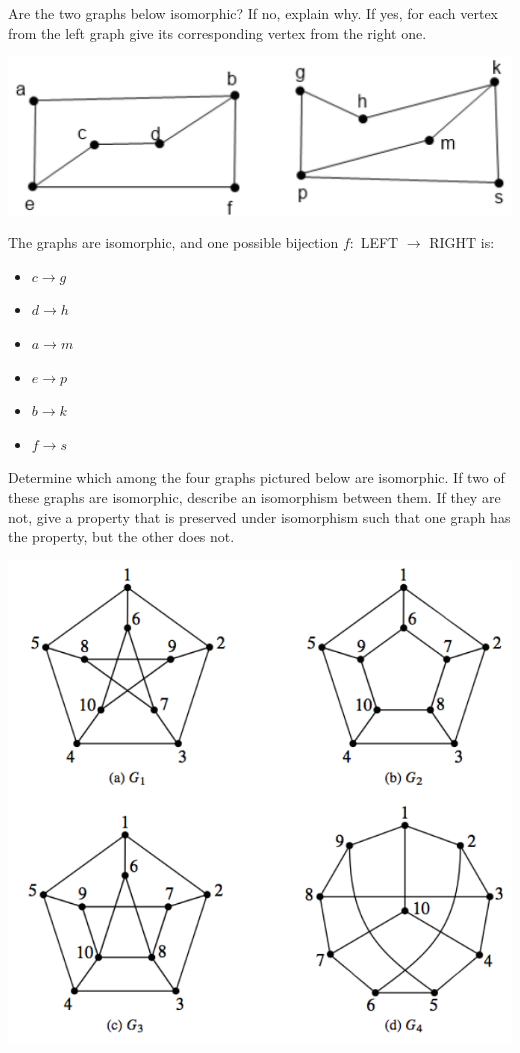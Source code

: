 \documentclass[solution, letterpaper]{cs20inclass}
\begin{document}
\problem Are the two graphs below isomorphic? If no, explain why. If yes, for each vertex from the left graph give its corresponding vertex from the right one.
\begin{center}
\includegraphics[scale=0.4]{isomorphisms.png}
\end{center}

\begin{solution} The graphs are isomorphic, and one possible bijection $f: $ LEFT $ \rightarrow $ RIGHT is:
\begin{itemize}
\item[] $ c \rightarrow g $
\item[] $ d \rightarrow h $
\item[] $ a \rightarrow m $
\item[] $ e \rightarrow p $
\item[] $ b \rightarrow k $
\item[] $ f \rightarrow s $
\end{itemize}
\end{solution}

\problem Determine which among the four graphs pictured below are isomorphic. If two of these graphs are isomorphic, describe an isomorphism between them. If they are not, give a property that is preserved under isomorphism such that one graph has the property, but the other does not.
\begin{center}
\includegraphics[scale=0.45]{isomorphisms_4.png}
\end{center}
\end{document}
